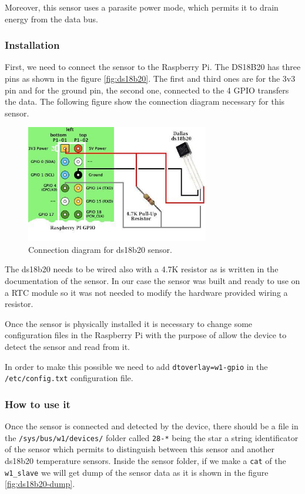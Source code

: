 		Moreover, this sensor uses a parasite power mode, which permits it to drain energy from the data bus.

			\subsubsection{Installation}
			First, we need to connect the sensor to the Raspberry Pi. The DS18B20 has three pins as shown in the figure \ref{fig:ds18b20}. The first and third ones are for the 3v3 pin and for the ground pin, the second one, connected to the 4 GPIO transfers the data. The following figure show the connection diagram necessary for this sensor.

			\begin{figure}[h!]
			\includegraphics[width=8cm]{fig/ds18b20-connections.jpg}
			\centering
			\caption{Connection diagram for ds18b20 sensor.\label{fig:ds18b20-connection}}
			\end{figure}

			The ds18b20 needs to be wired also with a 4.7K resistor as is written in the documentation of the sensor.
			In our case the sensor was built and ready to use on a RTC module so it was not needed to modify the hardware provided wiring a resistor.

			Once the sensor is physically installed it is necessary to change some configuration files in the Raspberry Pi with the purpose of allow the device to detect the sensor and read from it.

			In order to make this possible we need to add \texttt{dtoverlay=w1-gpio} in the \texttt{/etc/config.txt} configuration file.

			\subsubsection{How to use it}
			Once the sensor is connected and detected by the device, there should be a file in the \texttt{/sys/bus/w1/devices/} folder called \texttt{28-*} being the star a string identificator of the sensor which permits to distinguish between this sensor and another ds18b20 temperature sensors. Inside the sensor folder, if we make a \texttt{cat} of the \texttt{w1\_slave} we will get dump of the sensor data as it is shown in the figure \ref{fig:ds18b20-dump}.


